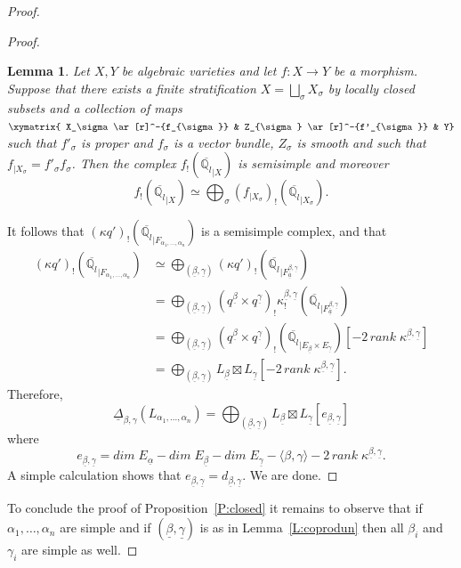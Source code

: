 \documentclass[a4paper,10pt]{amsart}
\def\a{\alpha}
\def\qlb{\overline{\mathbb{Q}_l}}
\newtheorem{lem}[theo]{Lemma}
\numberwithin{equation}{section}
\begin{document}
\begin{proof}
\begin{proof}
\begin{lem}\label{L:816} Let $X,Y$ be algebraic varieties and let  $f: X \to Y$ be a morphism. Suppose that there exists a finite stratification $X=\bigsqcup_\sigma X_\sigma$ by locally closed subsets and a collection of maps
$\xymatrix{ X_\sigma \ar[r]^-{f_{\sigma}} & Z_{\sigma} \ar[r]^-{f'_{\sigma}} & Y}$ such that $f'_{\sigma}$ is proper and $f_{\sigma}$ is a vector bundle, $Z_{\sigma}$ is smooth and such that $f_{|X_{\sigma}}=f'_{\sigma} f_{\sigma}$. Then the complex $f_!(\qlb_{|X})$ is semisimple and moreover
$$f_!(\qlb_{|X})\simeq \bigoplus_{\sigma} (f_{|X_{\sigma}})_!(\qlb_{|X_{\sigma}}).$$
\end{lem}

It follows that $(\kappa q')_{!} (\qlb_{|F_{\a_1, \ldots, \a_n}})$ is a semisimple complex, and that 
\begin{equation*}
\begin{split}
(\kappa q')_! (\qlb_{|F_{\a_1, \ldots, \a_n}}) &\simeq \bigoplus_{(\underline{\beta}, \underline{\gamma})} (\kappa q')_! (\qlb_{|F_{\underline{a}}^{\underline{\beta}, \underline{\gamma}}})\\
&= \bigoplus_{(\underline{\beta}, \underline{\gamma})} (q^{\underline{\beta}} \times q^{\underline{\gamma}})_! \kappa^{\underline{\beta}, \underline{\gamma}}_! (\qlb_{|F_{\underline{a}}^{\underline{\beta}, \underline{\gamma}}})\\
&= \bigoplus_{(\underline{\beta}, \underline{\gamma})} (q^{\underline{\beta}} \times q^{\underline{\gamma}})_! (\qlb_{|E_{\underline{\beta}} \times E_{\underline{\gamma}}})[-2 \,rank\; \kappa^{\underline{\beta}, \underline{\gamma}}]\\
&= \bigoplus_{(\underline{\beta}, \underline{\gamma})}L_{\underline{\beta}} \boxtimes L_{\underline{\gamma}} [-2 \,rank\; \kappa^{\underline{\beta}, \underline{\gamma}}].
\end{split}
\end{equation*}
Therefore, 
\begin{equation}\label{E:43}
\underline{\Delta}_{\beta, \gamma}(L_{\a_1, \ldots, \a_n})=\bigoplus_{(\underline{\beta}, \underline{\gamma})} L_{\underline{\beta}} \boxtimes L_{\underline{\gamma}}[e_{\underline{\beta}, \underline{\gamma}}]
\end{equation}
where
\begin{equation*}
e_{\underline{\beta}, \underline{\gamma}}=
dim\;E_{\underline{\a}} - dim\;E_{\underline{\beta}} - dim\;E_{\underline{\gamma}}-\langle \beta, \gamma \rangle -2 \,rank\; \kappa^{\underline{\beta}, \underline{\gamma}}.
\end{equation*}
A simple calculation shows that $e_{\underline{\beta}, \underline{\gamma}}=d_{\underline{\beta}, \underline{\gamma}}$. We are done.
\end{proof}
To conclude the proof of Proposition~\ref{P:closed} it remains to observe that if $\a_1, \ldots, \a_n$ are simple and if $(\underline{\beta}, \underline{\gamma})$ is as in Lemma~\ref{L:coprodun} then all $\beta_i$ and $\gamma_i$ are simple as well. 
\end{proof}
\end{document}

